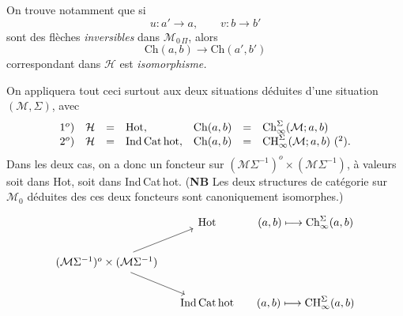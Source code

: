 \documentclass[11pt]{article}
\newcommand{\MOP}{\mathcal{M}_{0\,\Pi}}
\begin{document}
On trouve notamment que si
\[
u : a'\longrightarrow a, \qquad v : b\longrightarrow b'
\]
sont des flèches \textit{inversibles} dans $\MOP$, alors
\[
\mathrm{Ch}(a,b)\longrightarrow\mathrm{Ch}(a',b')
\]
correspondant dans $\mathcal{H}$ est \textit{isomorphisme.}

On appliquera tout ceci surtout aux deux situations déduites d'une situation $(\mathcal{M},\Sigma)$, avec
\[
\begin{array}{rlcllcl}
1^o) & \mathcal{H} & = & \mathrm{Hot}, & \mathrm{Ch}(a,b) & = & \mathrm{Ch}^{\Sigma}_{\infty}(\mathcal{M};a,b)\\
2^o) & \mathcal{H} & = & \mathrm{Ind\,Cat\,hot}, & \mathrm{Ch}(a,b) & = & \mathrm{CH}^{\Sigma}_{\infty}(\mathcal{M};a,b)\ \text{(\footnotemark[2])}.
\end{array}
\]
Dans les deux cas, on a donc un foncteur sur $(\mathcal{M}\Sigma^{-1})^o\times(\mathcal{M}\Sigma^{-1})$, à valeurs soit dans Hot, soit dans Ind\,Cat\,hot. (\textbf{NB} Les deux structures de catégorie sur $\mathcal{M}_0$ déduites des %
ces deux foncteurs sont canoniquement isomorphes.)
\[
\begin{tikzcd}[column sep=small]
 & \mathrm{Hot} & (a,b)\longmapsto\mathrm{Ch}^{\Sigma}_{\infty}(a,b)\\
(\mathcal{M}\Sigma^{-1})^o\times(\mathcal{M}\Sigma^{-1}) \arrow[ur] \arrow[dr] & & \\
 & \mathrm{Ind\,Cat\,hot} & (a,b)\longmapsto\mathrm{CH}^{\Sigma}_{\infty}(a,b)
\end{tikzcd}
\]
\end{document}
